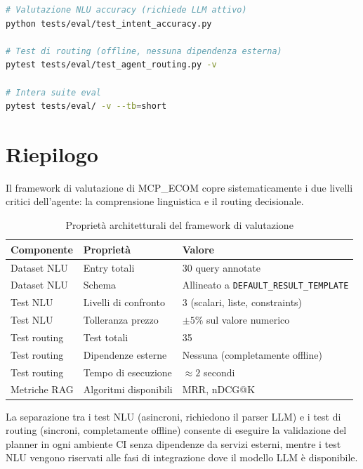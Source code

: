 \begin{lstlisting}[language=bash, caption={Comandi di esecuzione del framework di valutazione}]
# Valutazione NLU accuracy (richiede LLM attivo)
python tests/eval/test_intent_accuracy.py

# Test di routing (offline, nessuna dipendenza esterna)
pytest tests/eval/test_agent_routing.py -v

# Intera suite eval
pytest tests/eval/ -v --tb=short
\end{lstlisting}

\section{Riepilogo}
\label{sec:eval-summary}

Il framework di valutazione di MCP\_ECOM copre sistematicamente i due
livelli critici dell'agente: la comprensione linguistica e il routing
decisionale.

\begin{table}[htbp]
\centering
\caption{Proprietà architetturali del framework di valutazione}
\label{tab:eval-summary}
\begin{tabular}{lll}
\toprule
\textbf{Componente} & \textbf{Proprietà} & \textbf{Valore} \\
\midrule
Dataset NLU        & Entry totali              & 30 query annotate \\
Dataset NLU        & Schema                    & Allineato a \texttt{DEFAULT\_RESULT\_TEMPLATE} \\
Test NLU           & Livelli di confronto      & 3 (scalari, liste, constraints) \\
Test NLU           & Tolleranza prezzo         & $\pm 5\%$ sul valore numerico \\
Test routing       & Test totali               & 35 \\
Test routing       & Dipendenze esterne        & Nessuna (completamente offline) \\
Test routing       & Tempo di esecuzione       & $\approx 2$ secondi \\
Metriche RAG       & Algoritmi disponibili     & MRR, nDCG@K \\
\bottomrule
\end{tabular}
\end{table}

La separazione tra i test NLU (asincroni, richiedono il parser LLM)
e i test di routing (sincroni, completamente offline) consente di
eseguire la validazione del planner in ogni ambiente CI senza dipendenze
da servizi esterni, mentre i test NLU vengono riservati alle fasi di
integrazione dove il modello LLM è disponibile.
